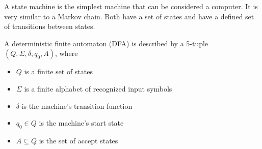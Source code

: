 
A state machine is the simplest machine that can be considered a computer.
It is very similar to a Markov chain.
Both have a set of states and have a defined set of transitions between states.

\begin{definition}
A deterministic finite automaton (DFA) is described by a 5-tuple $(Q, \Sigma, \delta, q_0, A)$,
where
\begin{itemize}
\item $Q$ is a finite set of states
\item $\Sigma$ is a finite alphabet of recognized input symbols
\item $\delta$ is the machine's transition function
\item $q_0 \in Q$ is the machine's start state
\item $A \subseteq Q$ is the set of accept states
\end{itemize}
\end{definition}

